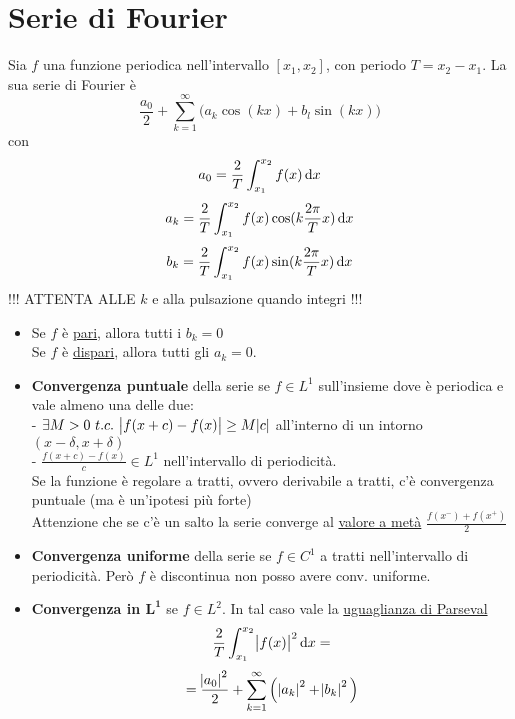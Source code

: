 \documentclass[a4paper,portrait,columns=3,5pt]{cheatsheet}
\begin{document}
\section{Serie di Fourier}
Sia $f$ una funzione periodica nell'intervallo $[x_1, x_2]$, con periodo $T = x_2 - x_1$. La sua serie di Fourier è $$ \frac{a_0}{2} + \sum_{k=1}^{\infty} \Big (a_k \cos(kx) + b_l \sin(kx)\Big)$$ 
con 
$$a_0 = \frac 2 T \int_{x_1}^{x_2} f(x) \dif x$$
$$ a_k = \frac{2}{T} \int_{x_1}^{x_2} f(x) \cos(k\frac{2\pi}{T}x) \dif x$$ $$ b_k = \frac{2}{T} \int_{x_1}^{x_2} f(x) \sin(k\frac{2\pi}{T}x) \dif x$$ !!! ATTENTA ALLE $k$ e alla pulsazione quando integri !!!
\begin{itemize}
    \item Se $f$ è \underline{pari}, allora tutti i  $b_k = 0$\\Se $f$ è \underline{dispari}, allora tutti gli $a_k = 0$.
    \item \textbf{Convergenza puntuale} della serie se $f \in L^1$ sull'insieme dove è periodica e vale almeno una delle due:\\ - $\exists M> 0~t.c.~ \abs{f(x+c) - f(x)} \geq M\abs{c}$ all'interno di un intorno $(x - \delta, x + \delta)$\\ - $\frac{f(x+c) - f(x)}{c} \in L^1$ nell'intervallo di periodicità.\\
    Se la funzione è regolare a tratti, ovvero derivabile a tratti, c'è convergenza puntuale (ma è un'ipotesi più forte)\\
    Attenzione che se c'è un salto la serie converge al \underline{valore a metà} $\frac{f(x^-) + f(x^+)}{2}$
    \item \textbf{Convergenza uniforme} della serie se $f\in C^1$ a tratti nell'intervallo di periodicità. Però $f$ è discontinua non posso avere conv. uniforme.
    \item \textbf{Convergenza in $\mathbf{L^1}$} se $f \in L^2$. In tal caso vale la \underline{uguaglianza di Parseval} $$ \frac 2 T \int_{x_1}^{x_2} \abs{f(x)}^2 \dif x = $$ $$ = \frac{\abs{a_0}^2}{2} +  \sum_{k=1}^{\infty} \Big( \abs{a_k}^2 + \abs{b_k}^2 \Big)$$
\end{itemize}
\end{document}
